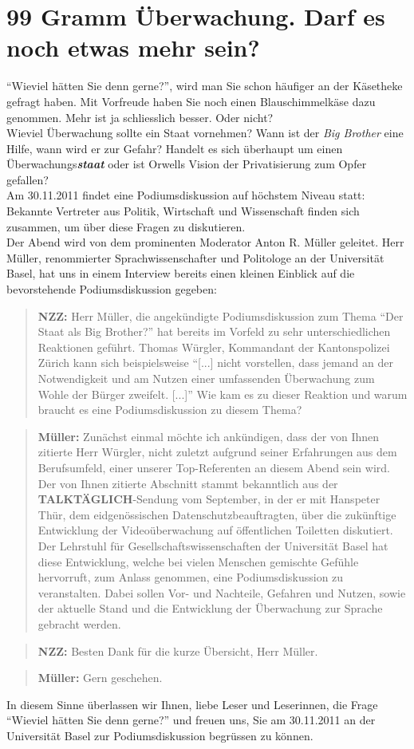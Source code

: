 \section*{99 Gramm Überwachung. Darf es noch etwas mehr sein?}
"`Wieviel hätten Sie denn gerne?"', wird man Sie schon
häufiger an der Käsetheke gefragt haben. Mit Vorfreude haben
Sie noch einen Blauschimmelkäse dazu genommen. Mehr ist ja
schliesslich besser. Oder nicht?\\
Wieviel Überwachung sollte ein Staat vornehmen? Wann ist
der \textit{Big Brother} eine Hilfe, wann wird er zur Gefahr?
Handelt es sich überhaupt um einen Überwachungs\textbf{\textit{staat}}
oder ist Orwells Vision der Privatisierung zum Opfer gefallen?\\
Am 30.11.2011 findet eine Podiumsdiskussion auf höchstem Niveau statt:
Bekannte Vertreter aus Politik, Wirtschaft
und Wissenschaft finden sich zusammen, um über diese Fragen zu diskutieren.\\ 
Der Abend wird von dem prominenten Moderator Anton R. Müller
geleitet. Herr Müller, renommierter Sprachwissenschafter und Politologe
an der Universität Basel, hat uns in
einem Interview bereits einen kleinen Einblick auf die
bevorstehende Podiumsdiskussion gegeben:

\begin{quote}
\textbf{NZZ:} Herr Müller, die angekündigte Podiumsdiskussion zum Thema
"`Der Staat als Big Brother?"' hat bereits im Vorfeld zu
sehr unterschiedlichen Reaktionen geführt. Thomas Würgler, 
Kommandant der Kantonspolizei Zürich kann sich beispielsweise "`[...] nicht
 vorstellen, dass jemand an der Notwendigkeit und am Nutzen
 einer umfassenden Überwachung zum Wohle der Bürger zweifelt. [...]"'
Wie kam es zu dieser Reaktion und warum braucht es eine  
Podiumsdiskussion zu diesem Thema?
\end{quote}
\begin{quote}
\textbf{Müller:} Zunächst einmal möchte ich ankündigen, dass
der von Ihnen zitierte Herr Würgler, nicht zuletzt aufgrund
seiner Erfahrungen aus dem Berufsumfeld, einer unserer Top-Refe\-renten
an diesem Abend sein wird. Der von Ihnen zitierte Abschnitt stammt
bekanntlich aus der \textbf{TALKTÄGLICH}-Sendung vom September,
in der er mit Hanspeter Thür,
dem eidgenössischen Datenschutzbeauftragten, über die zukünftige
Entwicklung der Videoüberwachung auf öffentlichen Toiletten
diskutiert.
Der Lehrstuhl für Gesellschaftswissenschaften der Universität Basel
hat diese Entwicklung, welche bei vielen Menschen gemischte Gefühle
hervorruft, zum Anlass genommen, eine Podiumsdiskussion zu veranstalten.
Dabei sollen Vor- und Nachteile, Gefahren und Nutzen, sowie der aktuelle
 Stand und die Entwicklung der Überwachung zur Sprache gebracht werden.
\end{quote}
\begin{quote}
\textbf{NZZ:} Besten Dank für die kurze Übersicht,
Herr Müller.
\end{quote}
\begin{quote}
\textbf{Müller:} Gern geschehen.
\end{quote}
In diesem Sinne überlassen wir Ihnen, liebe Leser und Leserinnen,
die Frage "`Wieviel hätten Sie denn gerne?"' und freuen uns, Sie am
30.11.2011 an der Universität Basel zur Podiumsdiskussion
begrüssen zu können.
